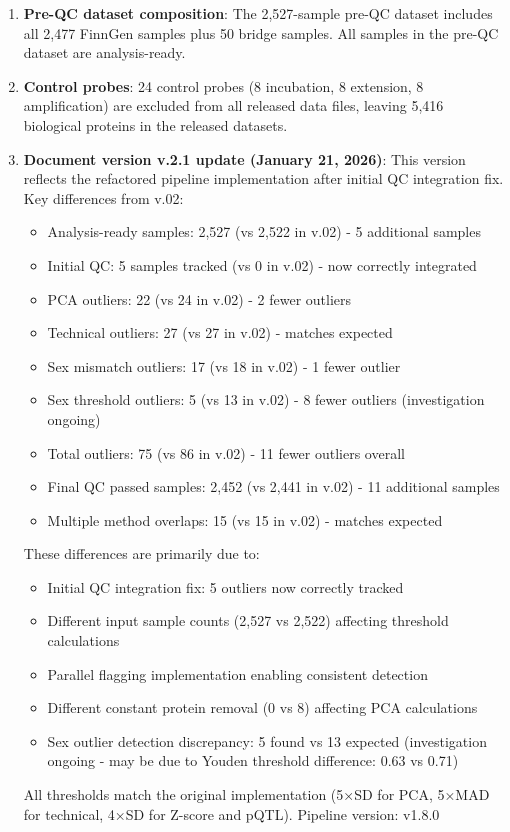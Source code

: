 \documentclass[11pt,a4paper]{article}
\begin{document}
\begin{enumerate}
\item \textbf{Pre-QC dataset composition}: The 2,527-sample pre-QC dataset includes all 2,477 FinnGen samples plus 50 bridge samples. All samples in the pre-QC dataset are analysis-ready.

\item \textbf{Control probes}: 24 control probes (8 incubation, 8 extension, 8 amplification) are excluded from all released data files, leaving 5,416 biological proteins in the released datasets.

\item \textbf{Document version v.2.1 update (January 21, 2026)}: This version reflects the refactored pipeline implementation after initial QC integration fix. Key differences from v.02:
  \begin{itemize}
    \item Analysis-ready samples: 2,527 (vs 2,522 in v.02) - 5 additional samples
    \item Initial QC: 5 samples tracked (vs 0 in v.02) - now correctly integrated
    \item PCA outliers: 22 (vs 24 in v.02) - 2 fewer outliers
    \item Technical outliers: 27 (vs 27 in v.02) - matches expected
    \item Sex mismatch outliers: 17 (vs 18 in v.02) - 1 fewer outlier
    \item Sex threshold outliers: 5 (vs 13 in v.02) - 8 fewer outliers (investigation ongoing)
    \item Total outliers: 75 (vs 86 in v.02) - 11 fewer outliers overall
    \item Final QC passed samples: 2,452 (vs 2,441 in v.02) - 11 additional samples
    \item Multiple method overlaps: 15 (vs 15 in v.02) - matches expected
  \end{itemize}
  These differences are primarily due to:
  \begin{itemize}
    \item Initial QC integration fix: 5 outliers now correctly tracked
    \item Different input sample counts (2,527 vs 2,522) affecting threshold calculations
    \item Parallel flagging implementation enabling consistent detection
    \item Different constant protein removal (0 vs 8) affecting PCA calculations
    \item Sex outlier detection discrepancy: 5 found vs 13 expected (investigation ongoing - may be due to Youden threshold difference: 0.63 vs 0.71)
  \end{itemize}
  All thresholds match the original implementation (5×SD for PCA, 5×MAD for technical, 4×SD for Z-score and pQTL). Pipeline version: v1.8.0
\end{enumerate}
\end{document}
